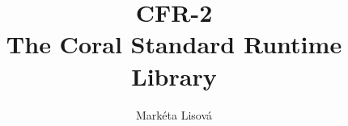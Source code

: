 \documentclass[12pt,a4paper,twoside,titlepage]{book}
\begin{document}
\frontmatter
\title{CFR-2\\ \large The Coral Standard Runtime Library}
\renewcommand{\docversion}{0.1}
\author{Markéta Lisová}
\maketitle
\clearemptydoublepage
\tableofcontents

\mainmatter
\sloppy



\appendix
\end{document}
